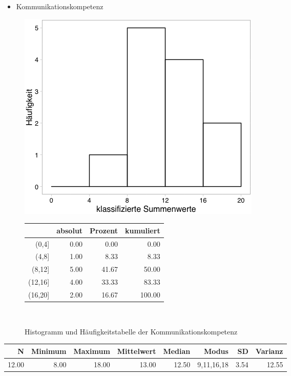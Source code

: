 \documentclass[12pt, bibliography=totoc]{scrartcl}
\begin{document}
\begin{itemize}
\tightlist
\item
  Kommunikationskompetenz
\end{itemize}

\begin{figure}[H]
\begin{minipage}{.5\linewidth}
\includegraphics[width=0.8\linewidth]{Anhang/KKHistnn.png}

\label{pic:aufbau}
\end{minipage}
\begin{minipage}{.5\linewidth}
\centering
\raisebox{\depth}
{\begin{tabular}{rrrr}
  \hline
 & absolut & Prozent & kumuliert \\
  \hline
(0,4] & 0.00 & 0.00 & 0.00 \\
  (4,8] & 1.00 & 8.33 & 8.33 \\
  (8,12] & 5.00 & 41.67 & 50.00 \\
  (12,16] & 4.00 & 33.33 & 83.33 \\
  (16,20] & 2.00 & 16.67 & 100.00 \\
   \hline
\end{tabular}

}
\label{tab:defis}
\end{minipage}
\caption{Histogramm und Häufigkeitstabelle der Kommunikationskompetenz}
\
\end{figure}

\begin{table}[H]
\centering
\begin{tabular}{rrrrrrrr}
  \hline
  N & Minimum & Maximum & Mittelwert & Median & Modus & SD & Varianz \\
  \hline
 12.00 & 8.00 & 18.00 & 13.00 & 12.50 & 9,11,16,18 & 3.54 & 12.55 \\

\end{tabular}
\end{table}
\end{document}
